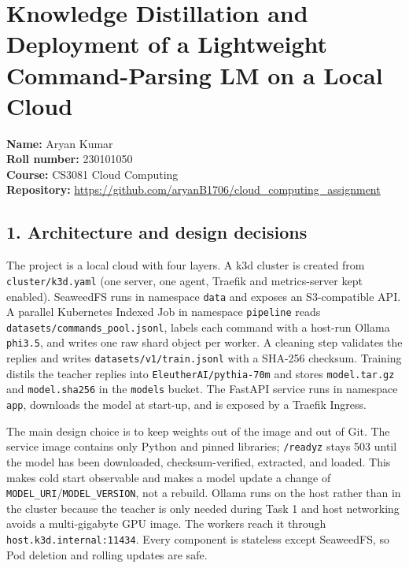 \documentclass[
]{article}
\author{}
\date{}
\begin{document}
\hypertarget{knowledge-distillation-and-deployment-of-a-lightweight-command-parsing-lm-on-a-local-cloud}{%
\section{Knowledge Distillation and Deployment of a Lightweight
Command-Parsing LM on a Local
Cloud}\label{knowledge-distillation-and-deployment-of-a-lightweight-command-parsing-lm-on-a-local-cloud}}

\textbf{Name:} Aryan Kumar\\
\textbf{Roll number:} 230101050\\
\textbf{Course:} CS3081 Cloud Computing\\
\textbf{Repository:}
\url{https://github.com/aryanB1706/cloud_computing_assignment}

\hypertarget{architecture-and-design-decisions}{%
\subsection{1. Architecture and design
decisions}\label{architecture-and-design-decisions}}

The project is a local cloud with four layers. A k3d cluster is created
from \texttt{cluster/k3d.yaml} (one server, one agent, Traefik and
metrics-server kept enabled). SeaweedFS runs in namespace \texttt{data}
and exposes an S3-compatible API. A parallel Kubernetes Indexed Job in
namespace \texttt{pipeline} reads
\texttt{datasets/commands\_pool.jsonl}, labels each command with a
host-run Ollama \texttt{phi3.5}, and writes one raw shard object per
worker. A cleaning step validates the replies and writes
\texttt{datasets/v1/train.jsonl} with a SHA-256 checksum. Training
distils the teacher replies into \texttt{EleutherAI/pythia-70m} and
stores \texttt{model.tar.gz} and \texttt{model.sha256} in the
\texttt{models} bucket. The FastAPI service runs in namespace
\texttt{app}, downloads the model at start-up, and is exposed by a
Traefik Ingress.

The main design choice is to keep weights out of the image and out of
Git. The service image contains only Python and pinned libraries;
\texttt{/readyz} stays 503 until the model has been downloaded,
checksum-verified, extracted, and loaded. This makes cold start
observable and makes a model update a change of
\texttt{MODEL\_URI}/\texttt{MODEL\_VERSION}, not a rebuild. Ollama runs
on the host rather than in the cluster because the teacher is only
needed during Task 1 and host networking avoids a multi-gigabyte GPU
image. The workers reach it through \texttt{host.k3d.internal:11434}.
Every component is stateless except SeaweedFS, so Pod deletion and
rolling updates are safe.
\end{document}
